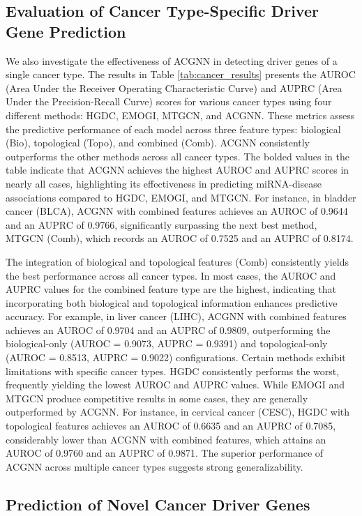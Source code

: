  
\subsection{Evaluation of Cancer Type-Specific Driver Gene Prediction}

We also investigate the effectiveness of ACGNN in detecting driver genes of a single cancer type. The results in Table \ref{tab:cancer_results} presents the AUROC (Area Under the Receiver Operating Characteristic Curve) and AUPRC (Area Under the Precision-Recall Curve) scores for various cancer types using four different methods: HGDC, EMOGI, MTGCN, and ACGNN. These metrics assess the predictive performance of each model across three feature types: biological (Bio), topological (Topo), and combined (Comb).
ACGNN consistently outperforms the other methods across all cancer types. The bolded values in the table indicate that ACGNN achieves the highest AUROC and AUPRC scores in nearly all cases, highlighting its effectiveness in predicting miRNA-disease associations compared to HGDC, EMOGI, and MTGCN. For instance, in bladder cancer (BLCA), ACGNN with combined features achieves an AUROC of 0.9644 and an AUPRC of 0.9766, significantly surpassing the next best method, MTGCN (Comb), which records an AUROC of 0.7525 and an AUPRC of 0.8174.

The integration of biological and topological features (Comb) consistently yields the best performance across all cancer types. In most cases, the AUROC and AUPRC values for the combined feature type are the highest, indicating that incorporating both biological and topological information enhances predictive accuracy. For example, in liver cancer (LIHC), ACGNN with combined features achieves an AUROC of 0.9704 and an AUPRC of 0.9809, outperforming the biological-only (AUROC = 0.9073, AUPRC = 0.9391) and topological-only (AUROC = 0.8513, AUPRC = 0.9022) configurations.
Certain methods exhibit limitations with specific cancer types. HGDC consistently performs the worst, frequently yielding the lowest AUROC and AUPRC values. While EMOGI and MTGCN produce competitive results in some cases, they are generally outperformed by ACGNN. For instance, in cervical cancer (CESC), HGDC with topological features achieves an AUROC of 0.6635 and an AUPRC of 0.7085, considerably lower than ACGNN with combined features, which attains an AUROC of 0.9760 and an AUPRC of 0.9871.
The superior performance of ACGNN across multiple cancer types suggests strong generalizability. 

 
  \subsection{Prediction of Novel Cancer Driver Genes}
  
